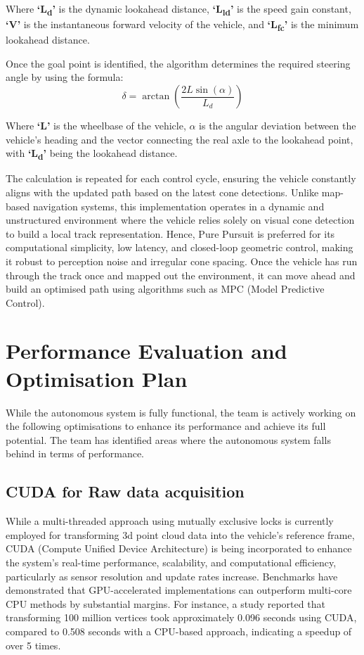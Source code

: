 \documentclass[conference]{IEEEtran}
\begin{document}
Where \textbf{‘L\textsubscript{d}'} is the dynamic lookahead distance, \textbf{‘L\textsubscript{ld}'} is the speed gain constant, \textbf{‘V'} is the instantaneous forward velocity of the vehicle, and \textbf{‘L\textsubscript{fc}'} is the minimum lookahead distance. 

Once the goal point is identified, the algorithm determines the required steering angle by using the formula:
\begin{equation}
\delta = \arctan\left(\frac{2L \sin(\alpha)}{L_d}\right)
\end{equation}

Where \textbf{‘L'} is the wheelbase of the vehicle, $\alpha$ is the angular deviation between the vehicle's heading and the vector connecting the real axle to the lookahead point, with \textbf{‘L\textsubscript{d}'} being the lookahead distance.

The calculation is repeated for each control cycle, ensuring the vehicle constantly aligns with the updated path based on the latest cone detections. Unlike map-based navigation systems, this implementation operates in a dynamic and unstructured environment where the vehicle relies solely on visual cone detection to build a local track representation. Hence, Pure Pursuit is preferred for its computational simplicity, low latency, and closed-loop geometric control, making it robust to perception noise and irregular cone spacing. Once the vehicle has run through the track once and mapped out the environment, it can move ahead and build an optimised path using algorithms such as MPC (Model Predictive Control).

\section{Performance Evaluation and Optimisation Plan}

While the autonomous system is fully functional, the team is actively working on the following optimisations to enhance its performance and achieve its full potential. The team has identified areas where the autonomous system falls behind in terms of performance.

\subsection{CUDA for Raw data acquisition}
While a multi-threaded approach using mutually exclusive locks is currently employed for transforming 3d point cloud data into the vehicle’s reference frame, CUDA (Compute Unified Device Architecture) is being incorporated to enhance the system’s real-time performance, scalability, and computational efficiency, particularly as sensor resolution and update rates increase. Benchmarks have demonstrated that GPU-accelerated implementations can outperform multi-core CPU methods by substantial margins\cite{b17}. For instance, a study reported that transforming 100 million vertices took approximately 0.096 seconds using CUDA, compared to 0.508 seconds with a CPU-based approach, indicating a speedup of over 5 times\cite{b18}.
\end{document}
